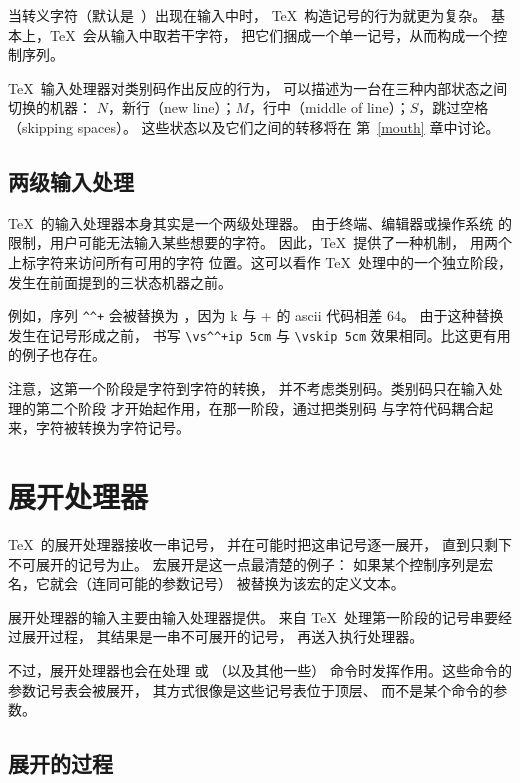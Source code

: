 \documentclass[a4paper]{rapport3}
\def\ascii{{\sc ascii}}
\begin{document}
当转义字符（默认是 \cs{}$\,$）出现在输入中时，
\TeX\ 构造记号的行为就更为复杂。
基本上，\TeX\ 会从输入中取若干字符，
把它们捆成一个单一记号，从而构成一个控制序列。

\TeX\ 输入处理器对类别码作出反应的行为，
可以描述为一台在三种内部状态之间切换的机器：
$N$，新行（new line）；$M$，行中（middle of line）；$S$，跳过空格（skipping spaces）。
这些状态以及它们之间的转移将在
第~\ref{mouth} 章中讨论。

\subsection{两级输入处理}

\TeX\ 的输入处理器本身其实是一个两级处理器。
由于终端、编辑器或操作系统
\awp
的限制，用户可能无法输入某些想要的字符。
因此，\TeX\ 提供了一种机制，
用两个上标字符来访问所有可用的字符
位置。这可以看作 \TeX\ 处理中的一个独立阶段，
发生在前面提到的三状态机器之前。

例如，序列 \verb>^^+> 会被替换为 ，因为
\n k 与 \n + 的 \ascii{} 代码相差 64。
由于这种替换发生在记号形成之前，
书写 \verb>\vs^^+ip 5cm> 与
\verb>\vskip 5cm> 效果相同。比这更有用的例子也存在。

注意，这第一个阶段是字符到字符的转换，
并不考虑类别码。类别码只在输入处理的第二个阶段
才开始起作用，在那一阶段，通过把类别码
与字符代码耦合起来，字符被转换为字符记号。

\section{展开处理器}

\TeX\ 的展开处理器接收一串记号，
并在可能时把这串记号逐一展开，
直到只剩下不可展开的记号为止。
宏展开是这一点最清楚的例子：
如果某个控制序列是宏名，它就会（连同可能的参数记号）
被替换为该宏的定义文本。

展开处理器的输入主要由输入处理器提供。
来自 \TeX\ 处理第一阶段的记号串要经过展开过程，
其结果是一串不可展开的记号，
再送入执行处理器。

不过，展开处理器也会在处理  或 （以及其他一些）
命令时发挥作用。这些命令的参数记号表会被展开，
其方式很像是这些记号表位于顶层、
而不是某个命令的参数。

\subsection{展开的过程}
\end{document}
